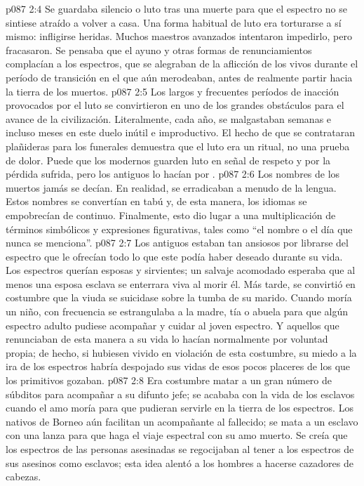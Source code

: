 \vs p087 2:4 Se guardaba silencio o luto tras una muerte para que el espectro no se sintiese atraído a volver a casa. Una forma habitual de luto era torturarse a sí mismo: infligirse heridas. Muchos maestros avanzados intentaron impedirlo, pero fracasaron. Se pensaba que el ayuno y otras formas de renunciamientos complacían a los espectros, que se alegraban de la aflicción de los vivos durante el período de transición en el que aún merodeaban, antes de realmente partir hacia la tierra de los muertos.
\vs p087 2:5 Los largos y frecuentes períodos de inacción provocados por el luto se convirtieron en uno de los grandes obstáculos para el avance de la civilización. Literalmente, cada año, se malgastaban semanas e incluso meses en este duelo inútil e improductivo. El hecho de que se contrataran plañideras para los funerales demuestra que el luto era un ritual, no una prueba de dolor. Puede que los modernos guarden luto en señal de respeto y por la pérdida sufrida, pero los antiguos lo hacían por .
\vs p087 2:6 Los nombres de los muertos jamás se decían. En realidad, se erradicaban a menudo de la lengua. Estos nombres se convertían en tabú y, de esta manera, los idiomas se empobrecían de continuo. Finalmente, esto dio lugar a una multiplicación de términos simbólicos y expresiones figurativas, tales como “el nombre o el día que nunca se menciona”.
\vs p087 2:7 \pc Los antiguos estaban tan ansiosos por librarse del espectro que le ofrecían todo lo que este podía haber deseado durante su vida. Los espectros querían esposas y sirvientes; un salvaje acomodado esperaba que al menos una esposa esclava se enterrara viva al morir él. Más tarde, se convirtió en costumbre que la viuda se suicidase sobre la tumba de su marido. Cuando moría un niño, con frecuencia se estrangulaba a la madre, tía o abuela para que algún espectro adulto pudiese acompañar y cuidar al joven espectro. Y aquellos que renunciaban de esta manera a su vida lo hacían normalmente por voluntad propia; de hecho, si hubiesen vivido en violación de esta costumbre, su miedo a la ira de los espectros habría despojado sus vidas de esos pocos placeres de los que los primitivos gozaban.
\vs p087 2:8 Era costumbre matar a un gran número de súbditos para acompañar a su difunto jefe; se acababa con la vida de los esclavos cuando el amo moría para que pudieran servirle en la tierra de los espectros. Los nativos de Borneo aún facilitan un acompañante al fallecido; se mata a un esclavo con una lanza para que haga el viaje espectral con su amo muerto. Se creía que los espectros de las personas asesinadas se regocijaban al tener a los espectros de sus asesinos como esclavos; esta idea alentó a los hombres a hacerse cazadores de cabezas.

